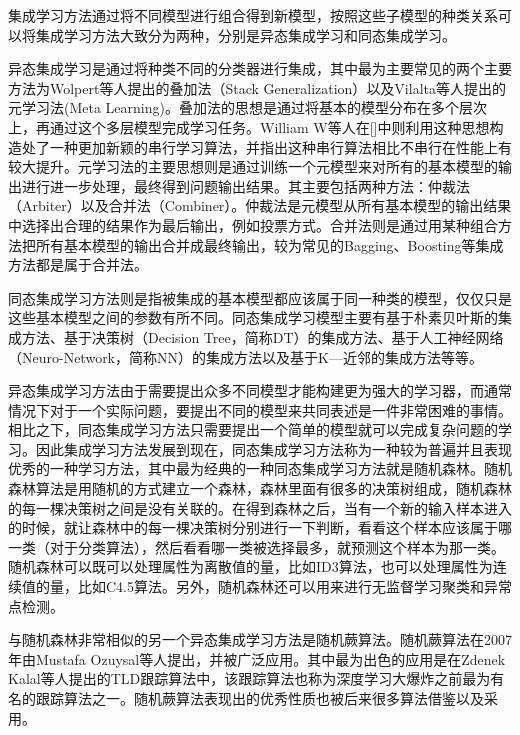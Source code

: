 集成学习方法通过将不同模型进行组合得到新模型，按照这些子模型的种类关系可以将集成学习方法大致分为两种，分别是异态集成学习和同态集成学习。

异态集成学习是通过将种类不同的分类器进行集成，其中最为主要常见的两个主要方法为Wolpert等人提出的叠加法（Stack Generalization）\cite{wolpert1992stacked}以及Vilalta等人提出的元学习法(Meta Learning)\cite{vilalta2002perspective}。叠加法的思想是通过将基本的模型分布在多个层次上，再通过这个多层模型完成学习任务。William W等人在[]中则利用这种思想构造处了一种更加新颖的串行学习算法，并指出这种串行算法相比不串行在性能上有较大提升。元学习法的主要思想则是通过训练一个元模型来对所有的基本模型的输出进行进一步处理，最终得到问题输出结果。其主要包括两种方法：仲裁法（Arbiter）以及合并法（Combiner）。仲裁法是元模型从所有基本模型的输出结果中选择出合理的结果作为最后输出，例如投票方式。合并法则是通过用某种组合方法把所有基本模型的输出合并成最终输出，较为常见的Bagging\cite{breiman1996bagging}、Boosting\cite{schapire1990strength}等集成方法都是属于合并法。

同态集成学习方法则是指被集成的基本模型都应该属于同一种类的模型，仅仅只是这些基本模型之间的参数有所不同。同态集成学习模型主要有基于朴素贝叶斯的集成方法、基于决策树（Decision Tree，简称DT）的集成方法\cite{kearns1996boosting}、基于人工神经网络（Neuro-Network，简称NN）的集成方法\cite{zhou2002ensembling}\cite{zhou2002selectively}\cite{hansen1990neural}以及基于K—近邻的集成方法\cite{shen2007euk}等等。

异态集成学习方法由于需要提出众多不同模型才能构建更为强大的学习器，而通常情况下对于一个实际问题，要提出不同的模型来共同表述是一件非常困难的事情。相比之下，同态集成学习方法只需要提出一个简单的模型就可以完成复杂问题的学习。因此集成学习方法发展到现在，同态集成学习方法称为一种较为普遍并且表现优秀的一种学习方法，其中最为经典的一种同态集成学习方法就是随机森林\cite{breiman2001random}。随机森林算法是用随机的方式建立一个森林，森林里面有很多的决策树组成，随机森林的每一棵决策树之间是没有关联的。在得到森林之后，当有一个新的输入样本进入的时候，就让森林中的每一棵决策树分别进行一下判断，看看这个样本应该属于哪一类（对于分类算法），然后看看哪一类被选择最多，就预测这个样本为那一类。随机森林可以既可以处理属性为离散值的量，比如ID3算法，也可以处理属性为连续值的量，比如C4.5算法。另外，随机森林还可以用来进行无监督学习聚类和异常点检测。

与随机森林非常相似的另一个异态集成学习方法是随机蕨算法\cite{ozuysal2007fast}。随机蕨算法在2007年由Mustafa Ozuysal等人提出，并被广泛应用。其中最为出色的应用是在Zdenek Kalal等人提出的TLD跟踪算法中\cite{kalal2012tracking}，该跟踪算法也称为深度学习大爆炸之前最为有名的跟踪算法之一。随机蕨算法表现出的优秀性质也被后来很多算法借鉴以及采用\cite{dollar2010cascaded}。

